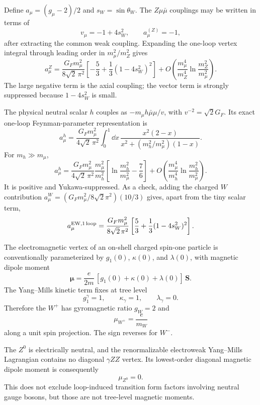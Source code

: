 \begin{enumerate}
  Define \(a_\mu=(g_\mu-2)/2\) and
  \(s_W=\sin\theta_W\).  The \(Z\mu\bar\mu\) couplings may be written in
  terms of
  \[
    v_\mu=-1+4s_W^2,\qquad a_\mu^{(Z)}=-1,
  \]
  after extracting the common weak coupling.  Expanding the one-loop
  vertex integral through leading order in \(m_\mu^2/m_Z^2\) gives
  \[
    \boxed{a_\mu^{Z}
      =\frac{G_Fm_\mu^2}{8\sqrt2\,\pi^2}
       \left[-\frac53+\frac13(1-4s_W^2)^2\right]
      +O\!\left(\frac{m_\mu^4}{m_Z^4}
        \ln\frac{m_Z^2}{m_\mu^2}\right).}
  \]
  The large negative term is the axial coupling; the vector term is
  strongly suppressed because \(1-4s_W^2\) is small.

  The physical neutral scalar \(h\) couples as
  \(-m_\mu h\bar\mu\mu/v\), with \(v^{-2}=\sqrt2G_F\).  Its exact
  one-loop Feynman-parameter representation is
  \[
    \boxed{a_\mu^h
      =\frac{G_Fm_\mu^2}{4\sqrt2\,\pi^2}
        \int_0^1\dd x\,
        \frac{x^2(2-x)}
        {x^2+(m_h^2/m_\mu^2)(1-x)}.}
  \]
  For \(m_h\gg m_\mu\),
  \[
    a_\mu^h
      =\frac{G_Fm_\mu^2}{4\sqrt2\,\pi^2}
       \frac{m_\mu^2}{m_h^2}
       \left[\ln\frac{m_h^2}{m_\mu^2}-\frac76\right]
       +O\!\left(\frac{m_\mu^4}{m_h^4}
         \ln\frac{m_h^2}{m_\mu^2}\right).
  \]
  It is positive and Yukawa-suppressed.  As a check, adding the charged
  \(W\) contribution
  \(a_\mu^W=(G_Fm_\mu^2/8\sqrt2\pi^2)(10/3)\) gives, apart from the tiny
  scalar term,
  \[
    a_\mu^{\rm EW,1\,loop}
      =\frac{G_Fm_\mu^2}{8\sqrt2\,\pi^2}
       \left[\frac53+\frac13(1-4s_W^2)^2\right].
  \]

  The electromagnetic vertex of an on-shell charged spin-one particle
  is conventionally parameterized by \(g_1(0)\), \(\kappa(0)\), and
  \(\lambda(0)\), with magnetic dipole moment
  \[
    \boldsymbol\mu
      =\frac{e}{2m}\,[g_1(0)+\kappa(0)+\lambda(0)]\,\mathbf S.
  \]
  The Yang--Mills kinetic term fixes at tree level
  \[
    g_1^\gamma=1,\qquad \kappa_\gamma=1,\qquad\lambda_\gamma=0.
  \]
  Therefore the \(W^+\) has gyromagnetic ratio \(g_W=2\) and
  \[
    \boxed{\mu_{W^+}=\frac{e}{m_W}}
  \]
  along a unit spin projection.  The sign reverses for \(W^-\).

  The \(Z^0\) is electrically neutral, and the renormalizable
  electroweak Yang--Mills Lagrangian contains no diagonal
  \(\gamma Z Z\) vertex.  Its lowest-order diagonal magnetic dipole
  moment is consequently
  \[
    \boxed{\mu_{Z^0}=0.}
  \]
  This does not exclude loop-induced transition form factors involving
  neutral gauge bosons, but those are not tree-level magnetic moments.


\end{enumerate}
